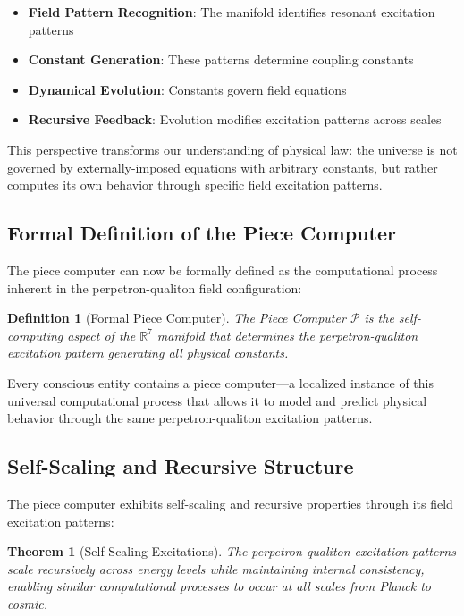 \documentclass{article}
\newtheorem{theorem}{Theorem}
\newtheorem{definition}{Definition}
\begin{document}
\begin{itemize}
\item \textbf{Field Pattern Recognition}: The manifold identifies resonant excitation patterns
\item \textbf{Constant Generation}: These patterns determine coupling constants
\item \textbf{Dynamical Evolution}: Constants govern field equations
\item \textbf{Recursive Feedback}: Evolution modifies excitation patterns across scales
\end{itemize}

This perspective transforms our understanding of physical law: the universe is not governed by externally-imposed equations with arbitrary constants, but rather computes its own behavior through specific field excitation patterns.

\subsection{Formal Definition of the Piece Computer}

The piece computer can now be formally defined as the computational process inherent in the perpetron-qualiton field configuration:

\begin{definition}[Formal Piece Computer]
The Piece Computer $\mathcal{P}$ is the self-computing aspect of the $\mathbb{R}^7$ manifold that determines the perpetron-qualiton excitation pattern generating all physical constants.
\end{definition}

Every conscious entity contains a piece computer—a localized instance of this universal computational process that allows it to model and predict physical behavior through the same perpetron-qualiton excitation patterns.

\subsection{Self-Scaling and Recursive Structure}

The piece computer exhibits self-scaling and recursive properties through its field excitation patterns:

\begin{theorem}[Self-Scaling Excitations]
The perpetron-qualiton excitation patterns scale recursively across energy levels while maintaining internal consistency, enabling similar computational processes to occur at all scales from Planck to cosmic.
\end{theorem}
\end{document}
